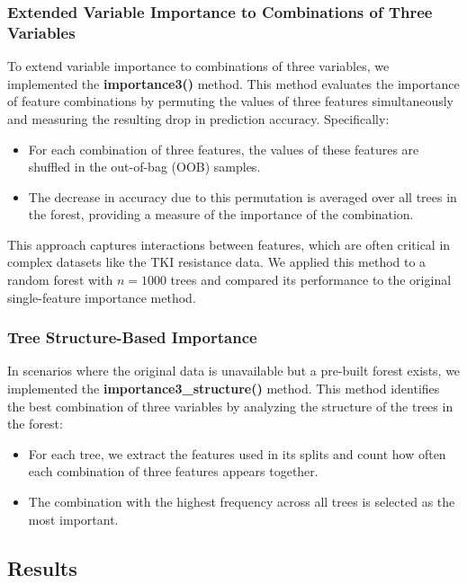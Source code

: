 \documentclass[fleqn,moreauthors,10pt]{ds_report}
\begin{document}
\subsubsection*{Extended Variable Importance to Combinations of Three Variables}
To extend variable importance to combinations of three variables, we implemented the \textbf{importance3()} method. This method evaluates the importance of feature combinations by permuting the values of three features simultaneously and measuring the resulting drop in prediction accuracy. Specifically:
\begin{itemize}
    \item For each combination of three features, the values of these features are shuffled in the out-of-bag (OOB) samples.
    \item The decrease in accuracy due to this permutation is averaged over all trees in the forest, providing a measure of the importance of the combination.
\end{itemize}
This approach captures interactions between features, which are often critical in complex datasets like the TKI resistance data. We applied this method to a random forest with \( n = 1000 \) trees and compared its performance to the original single-feature importance method.

\subsubsection*{Tree Structure-Based Importance}
In scenarios where the original data is unavailable but a pre-built forest exists, we implemented the \textbf{importance3\_structure()} method. This method identifies the best combination of three variables by analyzing the structure of the trees in the forest:
\begin{itemize}
    \item For each tree, we extract the features used in its splits and count how often each combination of three features appears together.
    \item The combination with the highest frequency across all trees is selected as the most important.
\end{itemize}

\subsection*{Results}
\end{document}
